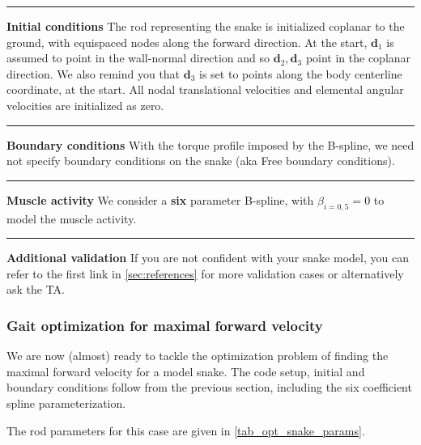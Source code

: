 \documentclass[11pt]{article}
\begin{document}
\noindent\rule{1\textwidth}{0.01pt}
\textbf{Initial conditions} The rod representing the snake is initialized coplanar
to the ground, with equispaced nodes along the forward direction. At the start, \(\mathbf{d}_1\) is assumed
to point in the wall-normal direction and so \(\mathbf{d}_2, \mathbf{d}_3\) point in the coplanar direction. We also remind you that \(\mathbf{d}_3\) is
set to points along the body centerline coordinate, at the start. All nodal
translational velocities and elemental angular velocities are initialized as zero.

\noindent\rule{1\textwidth}{0.01pt}
\textbf{Boundary conditions} With the torque profile imposed by the B-spline, we
need not specify boundary conditions on the snake (aka Free boundary conditions).

\noindent\rule{1\textwidth}{0.01pt}
\textbf{Muscle activity} We consider a \textbf{six} parameter B-spline,
with \(\beta_{i=0,5}=0\) to model the muscle activity.

\noindent\rule{1\textwidth}{0.01pt}
\textbf{Additional validation} If you are not confident with your snake model, you
can refer to the first link in \cref{sec:references} for more validation cases or alternatively
ask the TA.

\subsubsection{Gait optimization for maximal forward velocity}
\label{sec:orgd44c45f}
We are now (almost) ready to tackle the optimization problem of finding the
maximal forward velocity for a model snake. The code setup, initial and
boundary conditions follow from the previous section, including the
six coefficient spline parameterization.

The rod parameters for this case are given in \cref{tab_opt_snake_params}.
\end{document}
